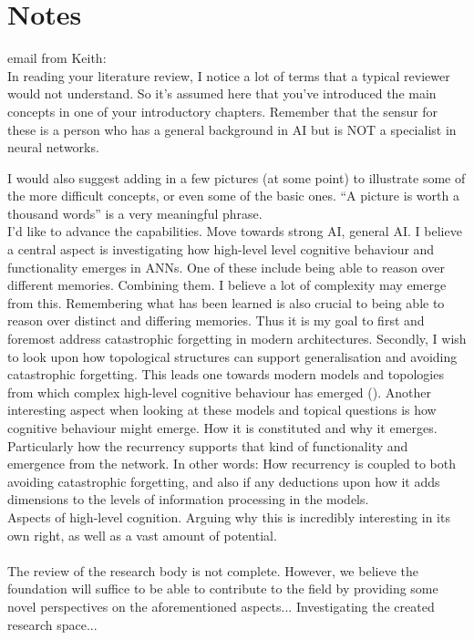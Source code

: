 \section{Notes}
email from Keith:
\\
  In reading your literature review, I notice a lot of terms that a typical reviewer would not understand.  So it’s assumed here that you’ve introduced the main concepts in one of your introductory chapters.  Remember that the
sensur for these is a person who has a general background in AI but is  NOT a specialist in neural networks.

  I would also suggest adding in a few pictures (at some point) to illustrate some of the more difficult concepts, or even some of the basic ones.  “A picture is worth a thousand words” is a very meaningful phrase.
\\
I'd like to advance the capabilities. Move towards strong AI, general AI.
I believe a central aspect is investigating how high-level level cognitive behaviour and functionality emerges in ANNs.
One of these include being able to reason over different memories. Combining them. I believe a lot of complexity may emerge from this.
Remembering what has been learned is also crucial to being able to reason over distinct and differing memories.
Thus it is my goal to first and foremost address catastrophic forgetting in modern architectures.
Secondly, I wish to look upon how topological structures can support generalisation and avoiding catastrophic forgetting.
This leads one towards modern models and topologies from which complex high-level cognitive behaviour has emerged (\cite{Tani2014}).
Another interesting aspect when looking at these models and topical questions is how cognitive behaviour might emerge. How it is constituted and why it emerges. Particularly how the recurrency supports that kind of functionality and emergence from the network. In other words: How recurrency is coupled to both avoiding catastrophic forgetting, and also if any deductions upon how it adds dimensions to the levels of information processing in the models.
\\
Aspects of high-level cognition. Arguing why this is incredibly interesting in its own right, as well as a vast amount of potential.
\\\\
The review of the research body is not complete. However, we believe the foundation will suffice to be able to contribute to the field by providing some novel perspectives on the aforementioned aspects... Investigating the created research space...
